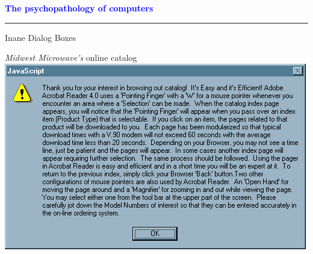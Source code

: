 \documentclass[pdf]{beamer}
\begin{document}
\begin{frame}
    \textcolor{Blue}{\textbf{\Large{The psychopathology of computers}}}
    \textcolor{red}{\rule{10cm}{1mm}}
    
{\LARGE{{Inane Dialog Boxes}}}
\newline

\normalsize{\textit{Midwest Microwave's} online catalog}
\includegraphics[scale=0.5]{34_javascript.png}

\end{frame}
\end{document}

